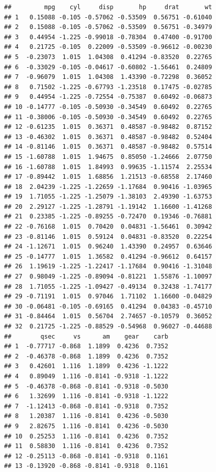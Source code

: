 \documentclass[]{book}
\begin{document}
\begin{verbatim}
##         mpg    cyl     disp       hp     drat       wt
## 1   0.15088 -0.105 -0.57062 -0.53509  0.56751 -0.61040
## 2   0.15088 -0.105 -0.57062 -0.53509  0.56751 -0.34979
## 3   0.44954 -1.225 -0.99018 -0.78304  0.47400 -0.91700
## 4   0.21725 -0.105  0.22009 -0.53509 -0.96612 -0.00230
## 5  -0.23073  1.015  1.04308  0.41294 -0.83520  0.22765
## 6  -0.33029 -0.105 -0.04617 -0.60802 -1.56461  0.24809
## 7  -0.96079  1.015  1.04308  1.43390 -0.72298  0.36052
## 8   0.71502 -1.225 -0.67793 -1.23518  0.17475 -0.02785
## 9   0.44954 -1.225 -0.72554 -0.75387  0.60492 -0.06873
## 10 -0.14777 -0.105 -0.50930 -0.34549  0.60492  0.22765
## 11 -0.38006 -0.105 -0.50930 -0.34549  0.60492  0.22765
## 12 -0.61235  1.015  0.36371  0.48587 -0.98482  0.87152
## 13 -0.46302  1.015  0.36371  0.48587 -0.98482  0.52404
## 14 -0.81146  1.015  0.36371  0.48587 -0.98482  0.57514
## 15 -1.60788  1.015  1.94675  0.85050 -1.24666  2.07750
## 16 -1.60788  1.015  1.84993  0.99635 -1.11574  2.25534
## 17 -0.89442  1.015  1.68856  1.21513 -0.68558  2.17460
## 18  2.04239 -1.225 -1.22659 -1.17684  0.90416 -1.03965
## 19  1.71055 -1.225 -1.25079 -1.38103  2.49390 -1.63753
## 20  2.29127 -1.225 -1.28791 -1.19142  1.16600 -1.41268
## 21  0.23385 -1.225 -0.89255 -0.72470  0.19346 -0.76881
## 22 -0.76168  1.015  0.70420  0.04831 -1.56461  0.30942
## 23 -0.81146  1.015  0.59124  0.04831 -0.83520  0.22254
## 24 -1.12671  1.015  0.96240  1.43390  0.24957  0.63646
## 25 -0.14777  1.015  1.36582  0.41294 -0.96612  0.64157
## 26  1.19619 -1.225 -1.22417 -1.17684  0.90416 -1.31048
## 27  0.98049 -1.225 -0.89094 -0.81221  1.55876 -1.10097
## 28  1.71055 -1.225 -1.09427 -0.49134  0.32438 -1.74177
## 29 -0.71191  1.015  0.97046  1.71102  1.16600 -0.04829
## 30 -0.06481 -0.105 -0.69165  0.41294  0.04383 -0.45710
## 31 -0.84464  1.015  0.56704  2.74657 -0.10579  0.36052
## 32  0.21725 -1.225 -0.88529 -0.54968  0.96027 -0.44688
##        qsec     vs      am    gear    carb
## 1  -0.77717 -0.868  1.1899  0.4236  0.7352
## 2  -0.46378 -0.868  1.1899  0.4236  0.7352
## 3   0.42601  1.116  1.1899  0.4236 -1.1222
## 4   0.89049  1.116 -0.8141 -0.9318 -1.1222
## 5  -0.46378 -0.868 -0.8141 -0.9318 -0.5030
## 6   1.32699  1.116 -0.8141 -0.9318 -1.1222
## 7  -1.12413 -0.868 -0.8141 -0.9318  0.7352
## 8   1.20387  1.116 -0.8141  0.4236 -0.5030
## 9   2.82675  1.116 -0.8141  0.4236 -0.5030
## 10  0.25253  1.116 -0.8141  0.4236  0.7352
## 11  0.58830  1.116 -0.8141  0.4236  0.7352
## 12 -0.25113 -0.868 -0.8141 -0.9318  0.1161
## 13 -0.13920 -0.868 -0.8141 -0.9318  0.1161

\end{verbatim}
\end{document}
